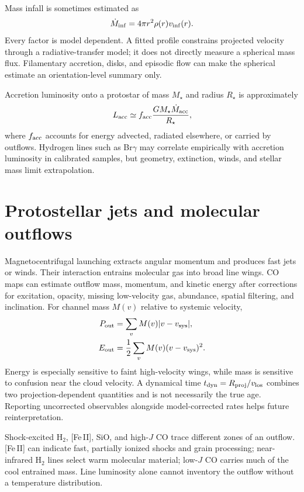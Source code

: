 Mass infall is sometimes estimated as
\begin{equation}
 \dot M_{\rm inf}=4\pi r^2\rho(r)v_{\rm inf}(r).
 \label{eq:mass-infall-rate}
\end{equation}
Every factor is model dependent.  A fitted profile constrains projected velocity
through a radiative-transfer model; it does not directly measure a spherical mass
flux.  Filamentary accretion, disks, and episodic flow can make the spherical estimate
an orientation-level summary only.

Accretion luminosity onto a protostar of mass $M_\star$ and radius $R_\star$ is
approximately
\begin{equation}
 L_{\rm acc}\simeq f_{\rm acc}\frac{GM_\star\dot M_{\rm acc}}{R_\star},
 \label{eq:accretion-luminosity}
\end{equation}
where $f_{\rm acc}$ accounts for energy advected, radiated elsewhere, or carried by
outflows.  Hydrogen lines such as Br$\gamma$ may correlate empirically with accretion
luminosity in calibrated samples, but geometry, extinction, winds, and stellar mass
limit extrapolation.

\section{Protostellar jets and molecular outflows}

Magnetocentrifugal launching extracts angular momentum and produces fast jets or
winds.  Their interaction entrains molecular gas into broad line wings.  CO maps can
estimate outflow mass, momentum, and kinetic energy after corrections for excitation,
opacity, missing low-velocity gas, abundance, spatial filtering, and inclination.
For channel mass $M(v)$ relative to systemic velocity,
\begin{align}
 P_{\rm out}&=\sum_v M(v)|v-v_{\rm sys}|,\\
 E_{\rm out}&=\frac{1}{2}\sum_vM(v)(v-v_{\rm sys})^2.
 \label{eq:outflow-momentum-energy}
\end{align}
Energy is especially sensitive to faint high-velocity wings, while mass is sensitive
to confusion near the cloud velocity.  A dynamical time $t_{\rm dyn}=R_{\rm proj}/
v_{\rm los}$ combines two projection-dependent quantities and is not necessarily the
true age.  Reporting uncorrected observables alongside model-corrected rates helps
future reinterpretation.

Shock-excited H$_2$, [Fe\,II], SiO, and high-$J$ CO trace different zones of an
outflow.  [Fe\,II] can indicate fast, partially ionized shocks and grain processing;
near-infrared H$_2$ lines select warm molecular material; low-$J$ CO carries much of
the cool entrained mass.  Line luminosity alone cannot inventory the outflow without
a temperature distribution.

